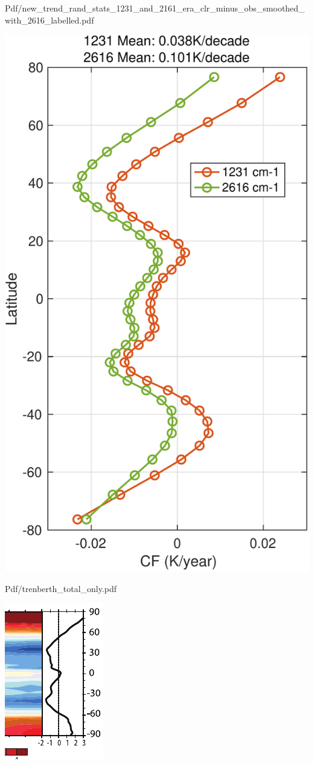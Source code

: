 \documentclass[10pt,t]{beamer}
\begin{document}
\begin{frame}[label={sec:org7f2f8de}]{Pdf/new\_trend\_rand\_stats\_1231\_and\_2161\_era\_clr\_minus\_obs\_smoothed\_with\_2616\_labelled.pdf}
\begin{center}
\includegraphics[width=0.4\linewidth]{./Figs/Pdf/new_trend_rand_stats_1231_and_2161_era_clr_minus_obs_smoothed_with_2616_labelled.pdf}
\end{center}
\end{frame}
\begin{frame}[label={sec:org60a0ede}]{Pdf/trenberth\_total\_only.pdf}
\begin{center}
\includegraphics[width=0.7\linewidth]{./Figs/Pdf/trenberth_total_only.pdf}
\end{center}
\end{frame}
\end{document}
